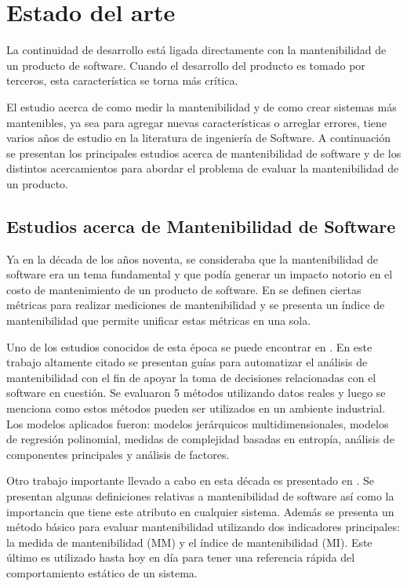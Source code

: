 \chapter{Estado del arte}

La continuidad de desarrollo está ligada directamente con la mantenibilidad
de un producto de software. Cuando el desarrollo del producto es tomado
por terceros, esta característica se torna más crítica.

El estudio acerca de como medir la mantenibilidad y de como crear sistemas
más mantenibles, ya sea para agregar nuevas características o arreglar
errores, tiene varios años de estudio en la literatura de ingeniería de Software.
A continuación se presentan los principales estudios acerca de mantenibilidad
de software y de los distintos acercamientos para abordar el problema
de evaluar la mantenibilidad de un producto.

\section{Estudios acerca de Mantenibilidad de Software}

Ya en la década de los años noventa, se consideraba que la mantenibilidad
de software era un tema fundamental y que podía generar un impacto notorio
en el costo de mantenimiento de un producto de software. En \cite{Oman:1992}
se definen ciertas métricas para realizar mediciones de mantenibilidad y se
presenta un índice de mantenibilidad que permite unificar estas métricas en
una sola.

Uno de los estudios conocidos de esta época se puede encontrar en \cite{Coleman:1996}.
En este trabajo altamente citado se presentan guías  para automatizar el análisis de
mantenibilidad con el fin de apoyar la toma de decisiones relacionadas con el
software en cuestión. Se evaluaron 5 métodos utilizando datos reales y luego
se menciona como estos métodos pueden ser utilizados en un ambiente industrial.
Los modelos aplicados fueron: modelos jerárquicos multidimensionales, modelos
de regresión polinomial, medidas de complejidad basadas en entropía, análisis
de componentes principales y análisis de factores.

Otro trabajo importante llevado a cabo en esta década es
presentado en \cite{West:1996}. Se presentan algunas definiciones
relativas a mantenibilidad de software así como la importancia que tiene
este atributo en cualquier sistema. Además se presenta un método básico
para evaluar mantenibilidad utilizando dos indicadores principales: la
medida de mantenibilidad (MM) y el índice de mantenibilidad (MI). Este último
es utilizado hasta hoy en día para tener una referencia rápida del comportamiento
estático de un sistema. 

